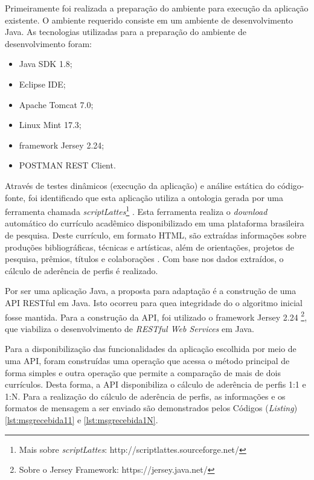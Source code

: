 Primeiramente foi realizada a preparação do ambiente para execução da aplicação existente. O ambiente requerido consiste em um ambiente de desenvolvimento Java. As tecnologias utilizadas para a preparação do ambiente de desenvolvimento foram:
\begin{itemize}
\item Java SDK 1.8;
\item Eclipse IDE;
\item Apache Tomcat 7.0;
\item Linux Mint 17.3;
\item framework Jersey 2.24;
\item POSTMAN REST Client.
\end{itemize}

Através de testes dinâmicos (execução da aplicação) e análise estática do código-fonte, foi identificado que esta aplicação utiliza a ontologia gerada por uma ferramenta chamada \textit{scriptLattes}\footnote{Mais sobre \textit{scriptLattes}: http://scriptlattes.sourceforge.net/} . Esta ferramenta realiza o \textit{download} automático do currículo acadêmico disponibilizado em uma plataforma brasileira de pesquisa. Deste currículo, em formato HTML, são extraídas informações sobre produções bibliográficas, técnicas e artísticas, além de orientações, projetos de pesquisa, prêmios, títulos e colaborações \cite{mena-chalco_scriptlattes:_2009}. Com base nos dados extraídos, o cálculo de aderência de perfis é realizado.

Por ser uma aplicação Java, a proposta para adaptação é a construção de uma API RESTful em Java. Isto ocorreu para quea integridade do o algoritmo inicial fosse mantida. Para a construção da API, foi utilizado o framework Jersey 2.24 \footnote{Sobre o Jersey Framework: https://jersey.java.net/}, que viabiliza o desenvolvimento de \textit{RESTful Web Services} em Java.

Para a disponibilização das funcionalidades da aplicação escolhida por meio de uma API, foram construídas uma operação que acessa o método principal de forma simples e outra operação que permite a comparação de mais de dois currículos. Desta forma, a API disponibiliza o cálculo de aderência de perfis 1:1 e 1:N. Para a realização do cálculo de aderência de perfis, as informações e os formatos de mensagem a ser enviado são demonstrados pelos Códigos (\textit{Listing}) \ref{lst:msgrecebida11} e \ref{lst:msgrecebida1N}.



